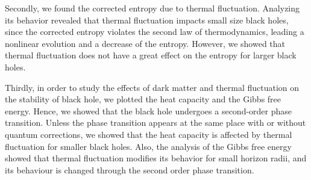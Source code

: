 \documentclass[10pt,letterpaper]{article}
\begin{document}
Secondly, we found the corrected entropy due to thermal fluctuation. Analyzing its behavior revealed that thermal fluctuation impacts small size black holes, since the corrected entropy violates the second law of thermodynamics, leading a nonlinear evolution and a decrease of the entropy. However, we showed that thermal fluctuation does not have a great effect on the entropy for larger black holes.

Thirdly, in order to study the effects of dark matter and thermal fluctuation on the stability of black hole, we plotted the heat capacity and the Gibbs free energy. Hence, we showed that the black hole undergoes a second-order phase transition. Unless the phase transition appears at the same place with or without quantum corrections, we showed that the heat capacity is affected by thermal fluctuation for smaller black holes.  Also, the analysis of the Gibbs free energy showed that thermal fluctuation modifies its behavior for small horizon radii, and its behaviour is changed through the second order phase transition. 



\end{document}
